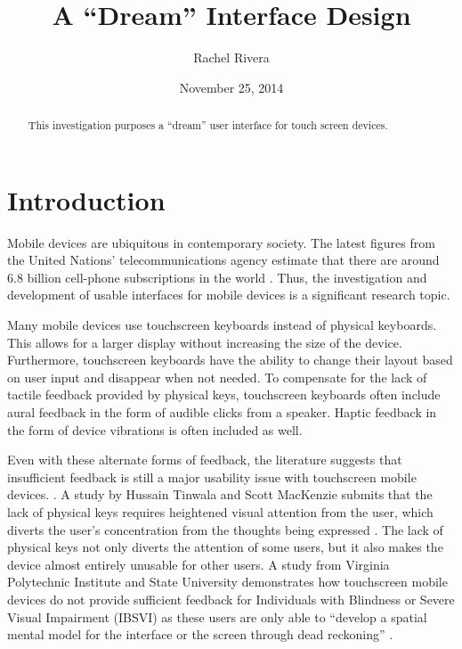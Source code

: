 \documentclass[11pt]{article}
\title{A ``Dream'' Interface Design}
\author{Rachel Rivera}
\date{November 25, 2014}
\begin{document}
\maketitle


\begin{abstract}
This investigation purposes a ``dream'' user interface for touch screen devices. 
\end{abstract}


\pagebreak
\tableofcontents



\pagebreak


\section{Introduction}
\label{Introduction}

Mobile devices are ubiquitous in contemporary society. The latest figures from the United Nations' telecommunications agency estimate that there are around 6.8 billion cell-phone subscriptions in the world \cite{UNTelecommunications	}. Thus, the investigation and development of usable interfaces for mobile devices is a significant research topic.

Many mobile devices use touchscreen keyboards instead of physical keyboards. This allows for a larger display without increasing the size of the device. Furthermore, touchscreen keyboards have the ability to change their layout based on user input and disappear when not needed. To compensate for the lack of tactile feedback provided by physical keys, touchscreen keyboards often include aural feedback in the form of audible clicks from a speaker. Haptic feedback in the form of device vibrations is often included as well.

Even with these alternate forms of feedback, the literature suggests that insufficient feedback is still a major usability issue with touchscreen mobile devices. \cite{Tinwala:2010:ETE:18	68914.1868972, Kane:2011:UGB:1978942.1979001, Hardy:2008:TIT:1409240.1409267, El-Glaly:2013:TTF:2460625.2460665, Buxton:1986:HID:22339.22386}. A study by Hussain Tinwala and Scott MacKenzie submits that the lack of physical keys requires heightened visual attention from the user, which diverts the user's concentration from the thoughts being expressed \cite{Tinwala:2010:ETE:18 68914.1868972}. The lack of physical keys not only diverts the attention of some users, but it also makes the device  almost entirely unusable for other users. A study from Virginia Polytechnic Institute and State University demonstrates how touchscreen mobile devices do not provide sufficient feedback for Individuals with Blindness or Severe Visual Impairment (IBSVI) as these users are only able to ``develop a spatial mental model for the interface or the screen through dead reckoning'' \cite{El-Glaly:2013:TTF:2460625.2460665}. 
\end{document}
